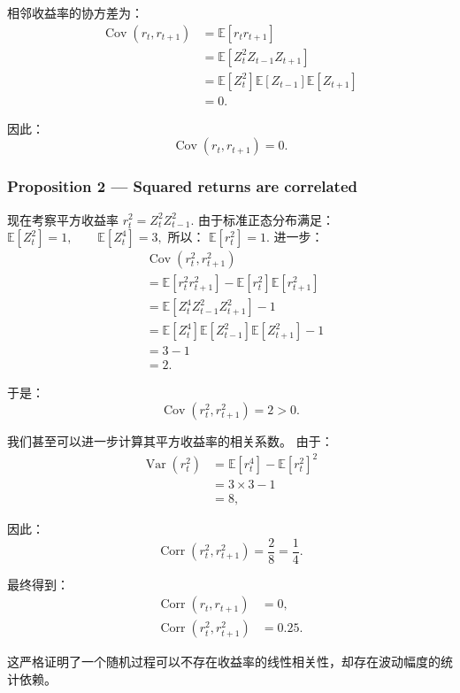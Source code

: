 相邻收益率的协方差为： \[\begin{aligned}
\operatorname{Cov}(r_t,r_{t+1})
&=\mathbb E[r_tr_{t+1}]\\
&=\mathbb E[Z_t^2Z_{t-1}Z_{t+1}]\\
&=\mathbb E[Z_t^2]
\mathbb E[Z_{t-1}]
\mathbb E[Z_{t+1}]\\
&=0.
\end{aligned}\]

因此： \[\boxed{
\operatorname{Cov}(r_t,r_{t+1})=0.
}\]

\hypertarget{proposition-2-squared-returns-are-correlated}{%
\subsubsection{Proposition 2 --- Squared returns are correlated}\label{proposition-2-squared-returns-are-correlated}}

现在考察平方收益率  \(r_t^2=Z_t^2Z_{t-1}^2.\) 由于标准正态分布满足： \(\mathbb E[Z_t^2]=1,
\qquad
\mathbb E[Z_t^4]=3,\) 所以： \(\mathbb E[r_t^2]=1.\) 进一步： \[\begin{aligned}
&\operatorname{Cov}(r_t^2,r_{t+1}^2)\\
&=\mathbb E[r_t^2r_{t+1}^2]
-\mathbb E[r_t^2]\mathbb E[r_{t+1}^2]\\
&=\mathbb E[Z_t^4Z_{t-1}^2Z_{t+1}^2]-1\\
&=\mathbb E[Z_t^4]
\mathbb E[Z_{t-1}^2]
\mathbb E[Z_{t+1}^2]-1\\
&=3-1\\
&=2.
\end{aligned}\]

于是： \[\boxed{
\operatorname{Cov}(r_t^2,r_{t+1}^2)=2>0.
}\]

我们甚至可以进一步计算其平方收益率的相关系数。 由于： \[\begin{aligned}
\operatorname{Var}(r_t^2)
&=\mathbb E[r_t^4]-\mathbb E[r_t^2]^2\\
&=3\times3-1\\
&=8,
\end{aligned}\]

因此： \[\operatorname{Corr}(r_t^2,r_{t+1}^2)
=
\frac28
=
\frac14.\]

最终得到： \[\boxed{
\begin{aligned}
\operatorname{Corr}(r_t,r_{t+1})&=0,\\
\operatorname{Corr}(r_t^2,r_{t+1}^2)&=0.25.
\end{aligned}
}\]

这严格证明了一个随机过程可以不存在收益率的线性相关性，却存在波动幅度的统计依赖。

